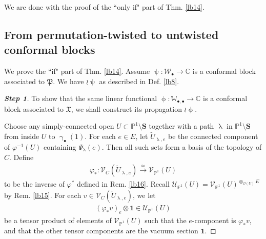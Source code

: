 \documentclass[12pt,a4paper,notitlepage]{article}
\theoremstyle{definition}
\theoremstyle{plain}
\newcommand{\fk}{\mathfrak}
\newcommand{\mc}{\mathcal}
\newcommand{\wtd}{\widetilde}
\newcommand{\id}{\mathbf{1}}
\newcommand{\scr}{\mathscr}
\newcommand{\blt}{\bullet}
\newcommand{\Wbb}{\mathbb W}
\newcommand{\Cbb}{\mathbb C}
\newcommand{\Pbb}{\mathbb P}
\newcommand{\Sbf}{\mathbf{S}}
\numberwithin{equation}{subsection}
\begin{document}
We are done with the proof of the ``only if" part of Thm. \ref{lb14}.




\subsection{From permutation-twisted to untwisted conformal blocks}\label{lb49}


We prove the ``if" part of Thm. \ref{lb14}. Assume $\uppsi:\mc W_\blt\rightarrow\Cbb$ is a conformal block associated to $\fk P$. We have $\wr\uppsi$ as described in Def. \ref{lb8}.



\begin{proof}[\textbf{Step 1}] To show that the same linear functional $\upphi:\Wbb_{\blt,\blt}\rightarrow\Cbb$ is a conformal block associated to $\fk X$, we shall construct its propagation $\wr\upphi$.


Choose any simply-connected open $U\subset\Pbb^1\setminus\Sbf$ together with a path $\uplambda$ in $\Pbb^1\setminus\Sbf$ from inside $U$ to $\upgamma_\blt(1)$. For each $e\in E$, let $\wtd U_{\uplambda,e}$ be the connected component of $\varphi^{-1}(U)$ containing $\Psi_{\uplambda}(e)$. Then all such sets form a basis of the topology of $C$. Define
\begin{align*}
\varphi_*:\scr V_C(\wtd U_{\uplambda,e})\xrightarrow{\simeq}\scr V_{\Pbb^1}(U)	
\end{align*}
to be the inverse of $\varphi^*$ defined in Rem. \ref{lb16}. Recall $\scr U_{\Pbb^1}(U)=\scr V_{\Pbb^1}(U)^{\otimes_{\scr O(U)} E}$ by Rem. \ref{lb15}. For each $v\in\scr V_C(\wtd U_{\uplambda,e})$,  we let
\begin{align*}
(\varphi_*v)_e\otimes\id\in\scr U_{\Pbb^1}(U)	
\end{align*}
be a tensor product of elements of $\scr V_{\Pbb^1}(U)$ such that the $e$-component is $\varphi_*v$, and that the other tensor components are the vacuum section $\id$.


\end{proof}
\end{document}
